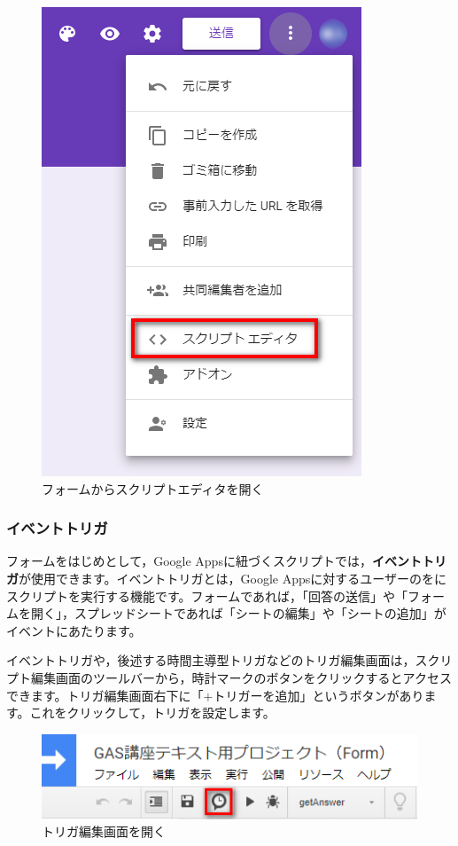 \documentclass[uplatex,a4j]{jsarticle}
\begin{document}
\begin{figure}[H]
 \centering
 \includegraphics[keepaspectratio, scale=0.5]{images/form_sample4.png}
 \caption{フォームからスクリプトエディタを開く}
 \label{fig:form_sample4}
\end{figure}

\subsubsection{イベントトリガ}
\label{ssub:event_trigger}

フォームをはじめとして，Google Appsに紐づくスクリプトでは，\textbf{イベントトリガ}が使用できます。イベントトリガとは，Google Appsに対するユーザーのをにスクリプトを実行する機能です。フォームであれば，「回答の送信」や「フォームを開く」，スプレッドシートであれば「シートの編集」や「シートの追加」がイベントにあたります。


イベントトリガや，後述する時間主導型トリガなどのトリガ編集画面は，スクリプト編集画面のツールバーから，時計マークのボタンをクリックするとアクセスできます。トリガ編集画面右下に「$+$トリガーを追加」というボタンがあります。これをクリックして，トリガを設定します。

\begin{figure}[H]
 \centering
 \includegraphics[keepaspectratio, scale=0.7]{images/trigger_button.png}
 \caption{トリガ編集画面を開く}
 \label{fig:trigger_button}
\end{figure}
\end{document}
